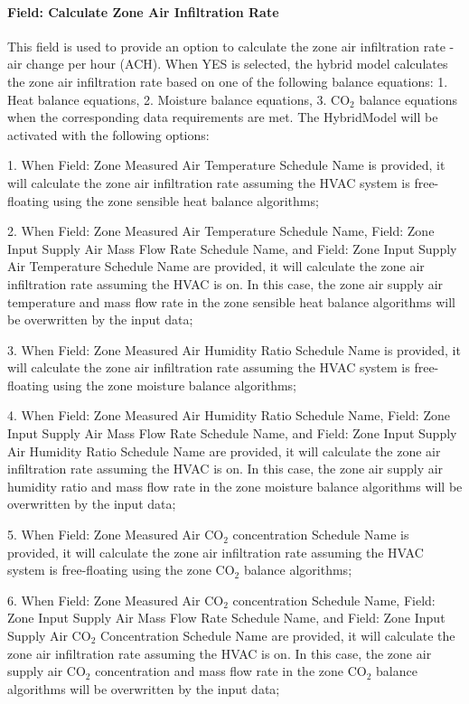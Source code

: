\paragraph{Field: Calculate Zone Air Infiltration Rate}\label{field-calculate-zone-air-infiltration-rate-hm}
This field is used to provide an option to calculate the zone air infiltration rate - air change per hour (ACH).
When YES is selected, the hybrid model calculates the zone air infiltration rate based on one of the following balance equations: 1. Heat balance equations, 2. Moisture balance equations, 3. CO$_2$ balance equations when the corresponding data requirements are met. The HybridModel will be activated with the following options:

1. When Field: Zone Measured Air Temperature Schedule Name is provided, it will calculate the zone air infiltration rate assuming the HVAC system is free-floating using the zone sensible heat balance algorithms;

2. When Field: Zone Measured Air Temperature Schedule Name, Field: Zone Input Supply Air Mass Flow Rate Schedule Name, and Field: Zone Input Supply Air Temperature Schedule Name are provided, it will calculate the zone air infiltration rate assuming the HVAC is on. In this case, the zone air supply air temperature and mass flow rate in the zone sensible heat balance algorithms will be overwritten by the input data;

3. When Field: Zone Measured Air Humidity Ratio Schedule Name is provided, it will calculate the zone air infiltration rate assuming the HVAC system is free-floating using the zone moisture balance algorithms;

4. When Field: Zone Measured Air Humidity Ratio Schedule Name, Field: Zone Input Supply Air Mass Flow Rate Schedule Name, and Field: Zone Input Supply Air Humidity Ratio Schedule Name are provided, it will calculate the zone air infiltration rate assuming the HVAC is on. In this case, the zone air supply air humidity ratio and mass flow rate in the zone moisture balance algorithms will be overwritten by the input data;

5. When Field: Zone Measured Air CO$_2$ concentration Schedule Name is provided, it will calculate the zone air infiltration rate assuming the HVAC system is free-floating using the zone CO$_2$ balance algorithms;

6. When Field: Zone Measured Air CO$_2$ concentration Schedule Name, Field: Zone Input Supply Air Mass Flow Rate Schedule Name, and Field: Zone Input Supply Air CO$_2$ Concentration Schedule Name are provided, it will calculate the zone air infiltration rate assuming the HVAC is on. In this case, the zone air supply air CO$_2$ concentration and mass flow rate in the zone CO$_2$ balance algorithms will be overwritten by the input data;


